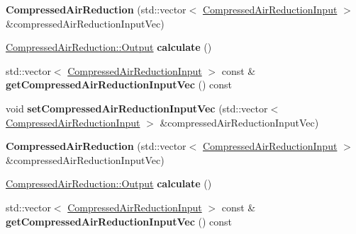 \begin{DoxyCompactItemize}
\item 
\mbox{\label{class_compressed_air_reduction_a94d9e61bf64e992c679c68510a21b6f2}} 
{\bfseries Compressed\+Air\+Reduction} (std\+::vector$<$ \hyperlink{class_compressed_air_reduction_input}{Compressed\+Air\+Reduction\+Input} $>$ \&compressed\+Air\+Reduction\+Input\+Vec)
\item 
\mbox{\label{class_compressed_air_reduction_a3d11a25bf311e886150d09cc308c47a2}} 
\hyperlink{struct_compressed_air_reduction_1_1_output}{Compressed\+Air\+Reduction\+::\+Output} {\bfseries calculate} ()
\item 
\mbox{\label{class_compressed_air_reduction_aad95f168b13d49824fbba687c7fa6ff9}} 
std\+::vector$<$ \hyperlink{class_compressed_air_reduction_input}{Compressed\+Air\+Reduction\+Input} $>$ const  \& {\bfseries get\+Compressed\+Air\+Reduction\+Input\+Vec} () const
\item 
\mbox{\label{class_compressed_air_reduction_a5ce8909011d63f84785014d7207a49de}} 
void {\bfseries set\+Compressed\+Air\+Reduction\+Input\+Vec} (std\+::vector$<$ \hyperlink{class_compressed_air_reduction_input}{Compressed\+Air\+Reduction\+Input} $>$ \&compressed\+Air\+Reduction\+Input\+Vec)
\item 
\mbox{\label{class_compressed_air_reduction_a94d9e61bf64e992c679c68510a21b6f2}} 
{\bfseries Compressed\+Air\+Reduction} (std\+::vector$<$ \hyperlink{class_compressed_air_reduction_input}{Compressed\+Air\+Reduction\+Input} $>$ \&compressed\+Air\+Reduction\+Input\+Vec)
\item 
\mbox{\label{class_compressed_air_reduction_a3d11a25bf311e886150d09cc308c47a2}} 
\hyperlink{struct_compressed_air_reduction_1_1_output}{Compressed\+Air\+Reduction\+::\+Output} {\bfseries calculate} ()
\item 
\mbox{\label{class_compressed_air_reduction_aad95f168b13d49824fbba687c7fa6ff9}} 
std\+::vector$<$ \hyperlink{class_compressed_air_reduction_input}{Compressed\+Air\+Reduction\+Input} $>$ const  \& {\bfseries get\+Compressed\+Air\+Reduction\+Input\+Vec} () const

\end{DoxyCompactItemize}
